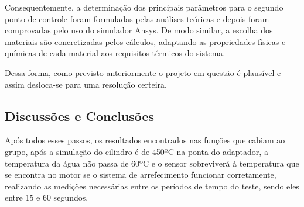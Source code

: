 Consequentemente, a determinação dos principais parâmetros para o segundo ponto de controle foram formuladas pelas análises teóricas e depois foram comprovadas pelo uso do simulador Ansys. De modo similar, a escolha dos materiais são concretizadas pelos cálculos, adaptando as propriedades físicas e químicas de cada material aos requisitos térmicos do sistema.

Dessa forma, como previsto anteriormente o projeto em questão é plausível e assim desloca-se para uma resolução certeira.

\subsection{Discussões e Conclusões}

Após todos esses passos, os resultados encontrados nas funções que cabiam ao grupo, após a simulação do cilindro é de 450ºC na ponta do adaptador, a temperatura da água não passa de 60ºC e o sensor sobreviverá à temperatura que se encontra no motor se o sistema de arrefecimento funcionar corretamente, realizando as medições necessárias entre os períodos de tempo do teste, sendo eles entre 15 e 60 segundos.
